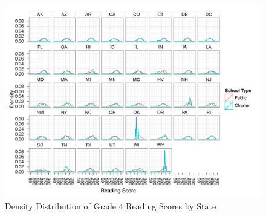 \documentclass[letterpaper,12p,twoside]{article} %
\begin{document}
\begin{singlespace}
 \clearpage
 \clearpage
\begin{figure}[h]
\begin{center}
\includegraphics[height=\textwidth,angle=90]{../Figures/g4readingDensityByState.pdf}
\caption{Density Distribution of Grade 4 Reading Scores by State}
\label{fig:g4reading:density}
\end{center}
\end{figure}
\clearpage


\end{singlespace}
\end{document}
